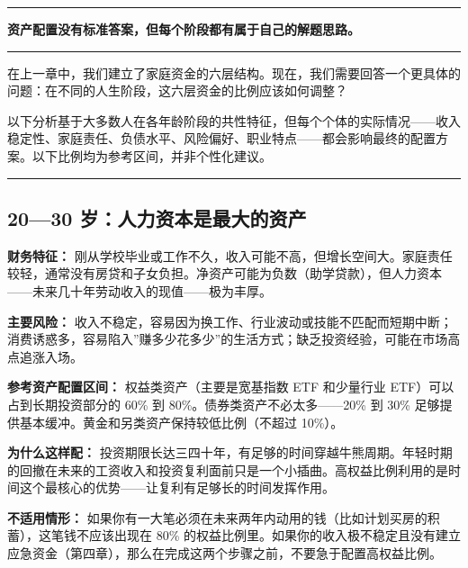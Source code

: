 \documentclass[a4paper,11pt,oneside,fontset=none,UTF8,zihao=-4]{ctexbook}
\begin{document}
\begin{center}{\color{dh-bronze}\rule{0.2\textwidth}{0.5pt}}\end{center}

\begin{dhquote}
\textbf{资产配置没有标准答案，但每个阶段都有属于自己的解题思路。}
\end{dhquote}

\begin{center}{\color{dh-bronze}\rule{0.2\textwidth}{0.5pt}}\end{center}

在上一章中，我们建立了家庭资金的六层结构。现在，我们需要回答一个更具体的问题：在不同的人生阶段，这六层资金的比例应该如何调整？

以下分析基于大多数人在各年龄阶段的共性特征，但每个个体的实际情况------收入稳定性、家庭责任、负债水平、风险偏好、职业特点------都会影响最终的配置方案。以下比例均为参考区间，并非个性化建议。

\begin{center}{\color{dh-bronze}\rule{0.2\textwidth}{0.5pt}}\end{center}

\subsection{20---30
岁：人力资本是最大的资产}\label{ux5c81ux4ebaux529bux8d44ux672cux662fux6700ux5927ux7684ux8d44ux4ea7}

\textbf{财务特征：}
刚从学校毕业或工作不久，收入可能不高，但增长空间大。家庭责任较轻，通常没有房贷和子女负担。净资产可能为负数（助学贷款），但人力资本------未来几十年劳动收入的现值------极为丰厚。

\textbf{主要风险：}
收入不稳定，容易因为换工作、行业波动或技能不匹配而短期中断；消费诱惑多，容易陷入''赚多少花多少''的生活方式；缺乏投资经验，可能在市场高点追涨入场。

\textbf{参考资产配置区间：} 权益类资产（主要是宽基指数 ETF 和少量行业
ETF）可以占到长期投资部分的 60\% 到 80\%。债券类资产不必太多------20\%
到 30\% 足够提供基本缓冲。黄金和另类资产保持较低比例（不超过 10\%）。

\textbf{为什么这样配：}
投资期限长达三四十年，有足够的时间穿越牛熊周期。年轻时期的回撤在未来的工资收入和投资复利面前只是一个小插曲。高权益比例利用的是时间这个最核心的优势------让复利有足够长的时间发挥作用。

\textbf{不适用情形：}
如果你有一大笔必须在未来两年内动用的钱（比如计划买房的积蓄），这笔钱不应该出现在
80\%
的权益比例里。如果你的收入极不稳定且没有建立应急资金（第四章），那么在完成这两个步骤之前，不要急于配置高权益比例。
\end{document}
